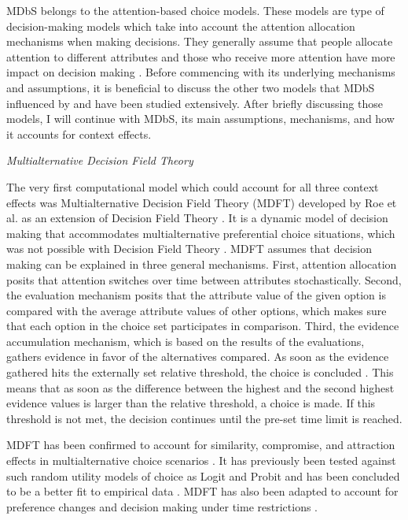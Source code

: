 \documentclass[a4paper,12pt]{article}
\newcommand{\citeyearonly}[1]{\citeyearpar{#1}}
\begin{document}
MDbS belongs to the attention-based choice models. These models are type of decision-making models which take into account the attention allocation mechanisms when making decisions. They generally assume that people allocate attention to different attributes and those who receive more attention have more impact on decision making \citep{gabaix2000boundedly}. Before commencing with its underlying mechanisms and assumptions, it is beneficial to discuss the other two models that MDbS influenced by and have been studied extensively. After briefly discussing those models, I will continue with MDbS, its main assumptions, mechanisms, and how it accounts for context effects.

\textit{Multialternative Decision Field Theory}

The very first computational model which could account for all three context effects was Multialternative Decision Field Theory (MDFT) developed by Roe et al. \citeyearonly{roe2001multialternative} as an extension of Decision Field Theory \citep{busemeyer1993decision}. It is a dynamic model of decision making that accommodates multialternative preferential choice situations, which was not possible with Decision Field Theory \citep{hotaling2019quantitative}. MDFT assumes that decision making can be explained in three general mechanisms. First, attention allocation posits that attention switches over time between attributes stochastically. Second, the evaluation mechanism posits that the attribute value of the given option is compared with the average attribute values of other options, which makes sure that each option in the choice set participates in comparison. Third, the evidence accumulation mechanism, which is based on the results of the evaluations, gathers evidence in favor of the alternatives compared. As soon as the evidence gathered hits the externally set relative threshold, the choice is concluded \citep{busemeyer2002survey}. This means that as soon as the difference between the highest and the second highest evidence values is larger than the relative threshold, a choice is made. If this threshold is not met, the decision continues until the pre-set time limit is reached.

MDFT has been confirmed to account for similarity, compromise, and attraction effects in multialternative choice scenarios \citep{roe2001multialternative}. It has previously been tested against such random utility models of choice as Logit and Probit and has been concluded to be a better fit to empirical data \citep{berkowitsch2014rigorously}. 
MDFT has also been adapted to account for preference changes \citep{mohr2017attraction} and decision making under time restrictions \citep{diederich2003mdft}.
\end{document}
